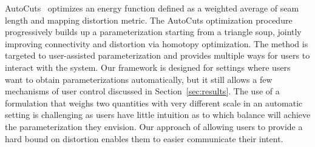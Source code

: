 %

AutoCuts~\cite{Poranne2017Autocuts} optimizes an energy function defined as a weighted average of seam length and mapping distortion metric. The AutoCuts optimization procedure progressively builds up a parameterization starting from a triangle soup, jointly improving connectivity and distortion via homotopy optimization. 
The method is targeted to user-assisted parameterization and provides multiple ways for users to interact with the system. Our framework is designed for settings where users want to obtain parameterizations automatically, but it still allows a few mechanisms of user control discussed in Section~\ref{sec:results}.  
The use of a formulation that weighs two quantities with very different scale in an automatic setting is challenging as users have little intuition as to which balance will achieve the parameterization they envision. Our approach of allowing users to provide a hard bound on distortion enables them to easier communicate their intent. 
%

